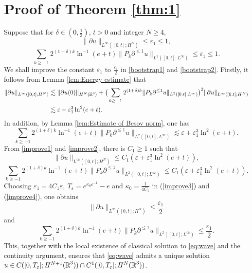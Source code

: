 \documentclass[11pt,twoside]{article}
\def\R{\mathop{\mathbb R\kern 0pt}\nolimits}
\def\f{\frac}
\def\p{\partial}
\def\ve{\varepsilon}
\def\ls{\lesssim}
\theoremstyle{plain}
\theoremstyle{definition}
\numberwithin{equation}{section}
\begin{document}
\section{Proof of Theorem \ref{thm:1}}\label{Section 5}

Suppose that for $\delta\in(0,\f{1}{3})$, $t>0$ and integer $N\ge 4$,
\begin{equation}\label{bootstrap1}
\|\p u\|_{L^\infty([0,t];H^N)}\le \varepsilon_1\le1,	
\end{equation}
\begin{equation}\label{bootstrap2}
	\sum_{k\ge-1}2^{(1+\delta) k}\ln^{-1}(e+t)\|P_k\p^{\le 1} u\|_{L^{2}([0,t];L^\infty) }\le \varepsilon_1\le1.
\end{equation}
We shall improve the constant $\varepsilon_1$ to $\f{\varepsilon_1}{2}$ in \eqref{bootstrap1} and \eqref{bootstrap2}.
Firstly, it follows from Lemma \ref{lem:Energy estimate} that
\begin{equation}\label{improve1}
\begin{split}
\|\p u\|_{L^\infty([0,t];H^N)}
&\ls\|\p u(0)\|_{H^N(\R^3)}+\big(\sum_{k\ge-1}2^{(1+\delta) k}\|P_k\p^{\le1 } u\|_{L^{2}([0,t];L^\infty)}\big)^2\|\p u\|_{L^\infty([0,t];H^N)}\\
&\ls \varepsilon +\varepsilon_1^3\ln^2(e+t).
\end{split}	
\end{equation}
In addition, by Lemma \ref{lem:Estimate of Besov norm}, one has
\begin{equation}\label{improve2}
\sum_{k\ge-1}2^{(1+\delta) k}\ln^{-1}(e+t)\|P_k\p^{\le1 } u\|_{L^{2}([0,t];L^\infty)}\ls \varepsilon +\varepsilon_1^3\ln^2(e+t).
\end{equation}
From \eqref{improve1} and \eqref{improve2}, there is $C_1 \ge 1$ such that
\begin{equation}\label{improve3}
\|\p u\|_{L^\infty([0,t];H^N)}\le C_1(\varepsilon +\varepsilon_1^3\ln^2(e+t)),
\end{equation}
\begin{equation}\label{improve4}
	\sum_{k\ge-1}2^{(1+\delta) k}\ln^{-1}(e+t) \|P_k\p^{\le1 } u\|_{L^{2}([0,t];L^\infty) }\le C_1( \varepsilon +\varepsilon_1^3\ln^2(e+t)).
\end{equation}
Choosing $\varepsilon_1 = 4C_1 \varepsilon,\ T_\ve = e^{\kappa_0\ve^{-1}}-e$ and $\kappa_0 = \f{1}{4C_1}$ in (\ref{improve3}) and (\ref{improve4}),
one obtains
\begin{equation*}
\|\p u\|_{L^\infty([0,t];H^N)}\le \f{\varepsilon_1}{2}	
\end{equation*}
and
\begin{equation*}
\sum_{k\ge-1}2^{(1+\delta) k}\ln^{-1}(e+t)\|P_k\p^{\le 1} u\|_{L^{2}([0,t];L^\infty)}\le \f{\varepsilon_1}{2}.
\end{equation*}
This, together with the local existence of classical solution to \eqref{eq:wave} and the continuity argument, ensures that
	\eqref{eq:wave} admits a unique solution $u\in C([0,T_\ve];H^{N+1}(\R^3))\cap C^1([0,T_\ve];H^{N}(\R^3))$.
\end{document}
